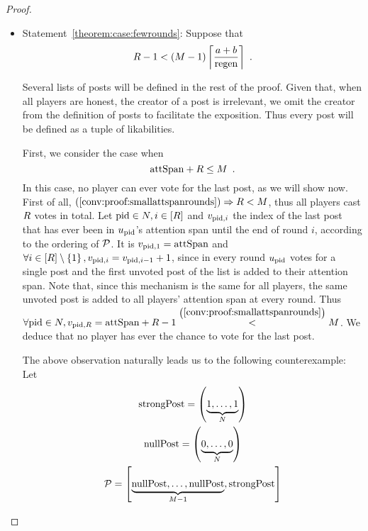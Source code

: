 \begin{proof}
\begin{itemize}
    \item Statement~\ref{theorem:case:fewrounds}: Suppose that
    \begin{equation}
      \label{conv:proof:fewrounds}
      \rounds - 1 < \left(\postlen - 1\right)\ceil*{\frac{a+b}{\regen}}
      \enspace.
    \end{equation}

    Several lists of posts will be defined in the rest of the proof. Given that,
    when all players are honest, the creator of a post is irrelevant, we omit
    the creator from the definition of posts to facilitate the exposition. Thus
    every post will be defined as a tuple of likabilities.

    First, we consider the case when
    \begin{equation}
      \label{conv:proof:smallattspanrounds}
      \mathrm{attSpan} + R \leq M \enspace.
    \end{equation}
    In this case, no player can ever vote for the last post, as we will show
    now. First of all, $(\ref{conv:proof:smallattspanrounds}) \Rightarrow
    R < M$, thus all players cast $R$ votes in total. Let
    $\mathrm{pid} \in N, i \in \left[R\right]$ and $v_{\mathrm{pid}, i}$ the
    index of the last post that has ever been in $u_{\mathrm{pid}}$'s attention
    span until the end of round $i$, according to the ordering of $\mathcal{P}$.
    It is $v_{\mathrm{pid}, 1} = \mathrm{attSpan}$ and $\forall i \in \left[R\right]
    \setminus \left\{1\right\}, v_{\mathrm{pid}, i} = v_{\mathrm{pid}, i - 1} + 1$, since in
    every round $u_{\mathrm{pid}}$ votes for a single post and the first unvoted
    post of the list is added to their attention span. Note that, since this
    mechanism is the same for all players, the same unvoted post is added to
    all players' attention span at every round. Thus $\forall \mathrm{pid} \in
    N, v_{\mathrm{pid}, R} = \mathrm{attSpan} + R - 1
    \overset{\left(\ref{conv:proof:smallattspanrounds}\right)}{<} M$.
    We deduce that no player has ever the chance to vote for the last post.

    The above observation naturally leads us to the following counterexample:
    Let
    \begin{gather*}
      \mathrm{strongPost} = \left(\underbrace{1, \dots, 1}_{N}\right) \\
      \mathrm{nullPost} = \left(\underbrace{0, \dots, 0}_{N}\right) \\
      \mathcal{P} = \left[\underbrace{\mathrm{nullPost}, \dots, \mathrm{nullPost}}_{M -
      1}, \mathrm{strongPost}\right]
    \end{gather*}


\end{itemize}
\end{proof}
